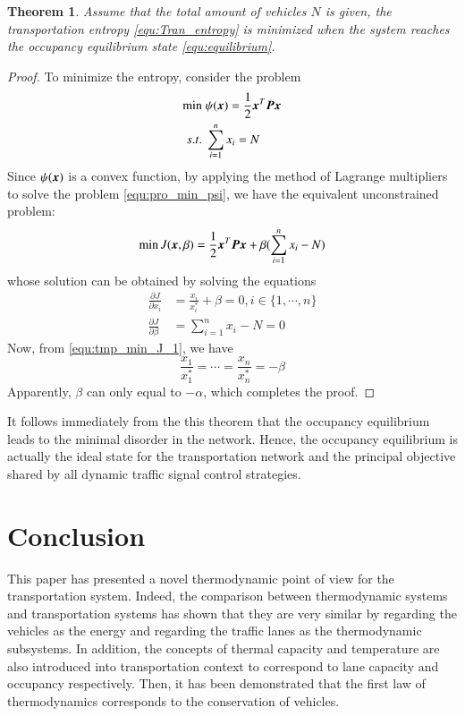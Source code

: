 \documentclass[preprint,authoryear,12pt]{elsarticle}
\renewcommand{\vec}[1]{\mbox{\boldmath$#1$}}
\newcommand{\mat}[1]{\mbox{\boldmath$#1$}}
\newtheorem{thm}{Theorem}
\begin{document}
\begin{thm}\label{thm:entropy_equilibrium}
Assume that the total amount of vehicles $N$ is given, the transportation entropy \eqref{equ:Tran_entropy} is minimized when the system reaches the occupancy equilibrium state \eqref{equ:equilibrium}.
\end{thm}
\begin{proof}
To minimize the entropy, consider the problem
\begin{align}\label{equ:pro_min_psi}
\min\; &\psi(\vec{x}) = \frac{1}{2}\vec{x}^T\mat{P}\vec{x}\\
s.t.\; &\sum_{i=1}^n x_i = N \nonumber
\end{align}
Since $\psi(\vec{x})$ is a convex function, by applying the method of Lagrange multipliers to solve the problem \eqref{equ:pro_min_psi}, we have the equivalent unconstrained problem:
$$\min J(\vec{x},\beta) = \frac{1}{2}\vec{x}^T\mat{P}\vec{x}+\beta(\sum_{i=1}^n x_i - N)$$
whose solution can be obtained by solving the equations
\begin{align}
\label{equ:tmp_min_J_1}
\frac{\partial J}{\partial x_i} &= \frac{x_i}{x_i^*}+\beta =0,
i\in\{1,\cdots,n\}\\
\label{equ:tmp_min_J_2}
\frac{\partial J}{\partial \beta} &= \sum_{i=1}^n x_i - N =0
\end{align}
Now, from \eqref{equ:tmp_min_J_1}, we have
$$\frac{x_1}{x_1^*}=\cdots=\frac{x_n}{x_n^*}=-\beta$$
Apparently, $\beta$ can only equal to $-\alpha$, which completes the proof.
\end{proof}

It follows immediately from the this theorem that the occupancy equilibrium leads to the minimal disorder in the network. Hence, the occupancy equilibrium is actually the ideal state for the transportation network and the principal objective shared by all dynamic traffic signal control strategies.

\section{Conclusion}

This paper has presented a novel thermodynamic point of view for the transportation system. Indeed, the comparison between thermodynamic systems and transportation systems has shown that they are very similar by regarding the vehicles as the energy and regarding the traffic lanes as the thermodynamic subsystems.
In addition, the concepts of thermal capacity and temperature are also introduced into transportation context to correspond to lane capacity and occupancy respectively. Then, it has been demonstrated that the first law of thermodynamics corresponds to the conservation of vehicles.
\end{document}
